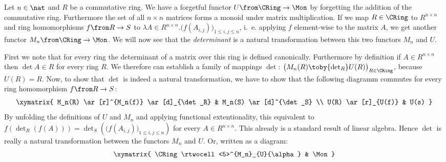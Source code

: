 \begin{exmp}
  Let $n\in\nat$ and $R$ be a commutative ring.
  We have a forgetful functor $U \from \CRing \to \Mon$ by forgetting the addition of the commutative ring.
  Furthermore the set of all $n \times n$ matrices forms a monoid under matrix multiplication.
  If we map $R \in \CRing$ to $R^{n \times n}$ and ring homomorphisms $f \from R \to S$ to
  $\lambda A \in R^{n \times n}. \bigl( f(A_{i,j}) \bigr)_{1 \le i, j \le n}$,
  i.~e. applying $f$ element-wise to the matrix $A$, we get another functor $M_n \from \CRing \to \Mon$.
  We will now see that the \emph{determinant} is a natural transformation between this two functors $M_n$ and $U$.

  First we note that for every ring the determinant of a matrix over this ring is defined canonically.
  Furthermore by definition if $A \in R^{n \times n}$ then $\det A \in R$ for every ring $R$.
  We therefore can establish a family of mappings $\det$:
  $\bigl(M_n(R)\toby{\det_R}U(R)\bigr)_{R\in\CRing}$, because $U(R) = R$.
  Now, to show that $\det$ is indeed a natural transformation, we have to show that the following diagramm commutes for every ring homomorphism $f \from R \to S$:
  \[\xymatrix{
    M_n(R) \ar[r]^{M_n(f)} \ar[d]_{\det_R} & M_n(S) \ar[d]^{\det_S} \\
    U(R) \ar[r]_{U(f)} & U(s)
  }\]
  By unfolding the definitions of $U$ and $M_n$ and applying functional extentionality, this equivalent to
  $f(\det_R(f(A))) = \det_S (\bigl( f(A_{i,j}) \bigr)_{1 \le i, j \le n})$
  for every $A \in R^{n \times n}$.
  This already is a standard result of linear algebra.
  Hence $\det$ is really a natural transformation between the functors $M_n$ and $U$. Or, written as a diagram:
  \[\xymatrix{
    \CRing \rtwocell<5>^{M_n}_{U}{\alpha} & \Mon
  }\]
\end{exmp}

